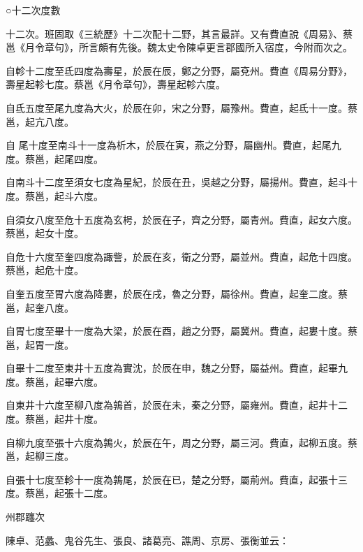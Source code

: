 \begin{pinyinscope}
{{ ○十二次度數



 十二次。班固取《三統歷》十二次配十二野，其言最詳。又有費直說《周易》、蔡邕《月令章句》，所言頗有先後。魏太史令陳卓更言郡國所入宿度，今附而次之。



 自軫十二度至氐四度為壽星，於辰在辰，鄭之分野，屬兗州。費直《周易分野》，壽星起軫七度。蔡邕《月令章句》，壽星起軫六度。



 自氐五度至尾九度為大火，於辰在卯，宋之分野，屬豫州。費直，起氐十一度。蔡邕，起亢八度。



 自
 尾十度至南斗十一度為析木，於辰在寅，燕之分野，屬幽州。費直，起尾九度。蔡邕，起尾四度。



 自南斗十二度至須女七度為星紀，於辰在丑，吳越之分野，屬揚州。費直，起斗十度。蔡邕，起斗六度。



 自須女八度至危十五度為玄枵，於辰在子，齊之分野，屬青州。費直，起女六度。蔡邕，起女十度。



 自危十六度至奎四度為諏訾，於辰在亥，衛之分野，屬並州。費直，起危十四度。蔡邕，起危十度。



 自奎五度至胃六度為降婁，於辰在戌，魯之分野，屬徐州。費直，起奎二度。蔡邕，起奎八度。



 自胃七度至畢十一度為大梁，於辰在酉，趙之分野，屬冀州。費直，起婁十度。蔡邕，起胃一度。



 自畢十二度至東井十五度為實沈，於辰在申，魏之分野，屬益州。費直，起畢九度。蔡邕，起畢六度。



 自東井十六度至柳八度為鶉首，於辰在未，秦之分野，屬雍州。費直，起井十二度。蔡邕，起井十度。



 自柳九度至張十六度為鶉火，於辰在午，周之分野，屬三河。費直，起柳五度。蔡邕，起柳三度。



 自張十七度至軫十一度為鶉尾，於辰在已，楚之分野，屬荊州。費直，起張十三度。蔡邕，起張十二度。



 州郡躔次



 陳卓、范蠡、鬼谷先生、張良、諸葛亮、譙周、京房、張衡並云：



}}
\end{pinyinscope}
